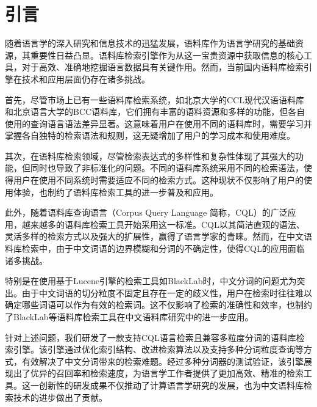 \documentclass[11pt]{article}
\begin{document}
\begin{CJK*}{UTF8}{gbsn}
\begin{englishabstract}
  
\end{englishabstract}

\section{引言}
\label{intro}

随着语言学的深入研究和信息技术的迅猛发展，语料库作为语言学研究的基础资源，其重要性日益凸显。语料库检索引擎作为从这一宝贵资源中获取信息的核心工具，对于高效、准确地挖掘语言数据具有关键作用。然而，当前国内语料库检索引擎在技术和应用层面仍存在诸多挑战。

首先，尽管市场上已有一些语料库检索系统，如北京大学的CCL现代汉语语料库\cite{ccl}和北京语言大学的BCC语料库\cite{bcc}，它们拥有丰富的语料资源和多样的功能，但各自使用的查询语言语法差异显著。这意味着用户在使用不同的语料库时，需要学习并掌握各自独特的检索语法和规则，这无疑增加了用户的学习成本和使用难度。

其次，在语料库检索领域，尽管检索表达式的多样性和复杂性体现了其强大的功能，但同时也导致了非标准化的问题。不同的语料库系统采用不同的检索语法，使得用户在使用不同系统时需要适应不同的检索方式。这种现状不仅影响了用户的使用体验，也制约了语料库检索工具的进一步普及和应用。

此外，随着语料库查询语言（Corpus Query Language 简称，CQL）的广泛应用，越来越多的语料库检索工具开始采用这一标准。CQL以其简洁直观的语法、灵活多样的检索方式以及强大的扩展性，赢得了语言学家的青睐。然而，在中文语料库检索中，由于中文词语的边界模糊和分词的不确定性，使得CQL的应用面临诸多挑战。

特别是在使用基于Lucene引擎的检索工具如BlackLab时，中文分词的问题尤为突出。由于中文词语的切分粒度不固定且存在一定的歧义性，用户在检索时往往难以确定哪些词语可以作为有效的检索词。这不仅影响了检索的准确性和效率，也制约了BlackLab等语料库检索工具在中文语料库研究中的进一步应用。

针对上述问题，我们研发了一款支持CQL语言检索且兼容多粒度分词的语料库检索引擎。该引擎通过优化索引结构、改进检索算法以及支持多种分词粒度查询等方式，有效解决了中文分词带来的检索难题。经过多种分词器的测试验证，该引擎展现出了优异的召回率和检索速度，为语言学工作者提供了更加高效、精准的检索工具。这一创新性的研发成果不仅推动了计算语言学研究的发展，也为中文语料库检索技术的进步做出了贡献。


\end{CJK*}
\end{document}
